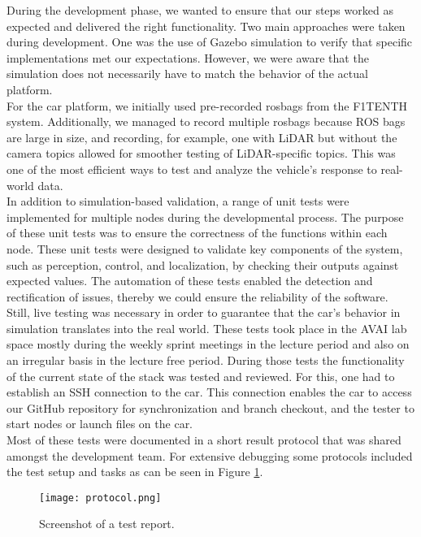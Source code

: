 During the development phase, we wanted to ensure that our steps worked as expected and delivered the right functionality. Two main approaches were taken during development. One was the use of Gazebo simulation to verify that specific implementations met our expectations. However, we were aware that the simulation does not necessarily have to match the behavior of the actual platform.\\
\newline
For the car platform, we initially used pre-recorded rosbags from the F1TENTH system. Additionally, we managed to record multiple rosbags because ROS bags are large in size, and recording, for example, one with LiDAR but without the camera topics allowed for smoother testing of LiDAR-specific topics. This was one of the most efficient ways to test and analyze the vehicle’s response to real-world data.\\
\newline
In addition to simulation-based validation, a range of unit tests were implemented for multiple nodes during the developmental process. The purpose of these unit tests was to ensure the correctness of the functions within each node. These unit tests were designed to validate key components of the system, such as perception, control, and localization, by checking their outputs against expected values. The automation of these tests enabled the detection and rectification of issues, thereby we could ensure the reliability of the software.\\
\newline
Still, live testing was necessary in order to guarantee that the car's behavior in simulation translates into the real world. These tests took place in the AVAI lab space mostly during the weekly sprint meetings in the lecture period and also on an irregular basis in the lecture free period. During those tests the functionality of the current state of the stack was tested and reviewed. For this, one had to establish an SSH connection to the car. This connection enables the car to access our GitHub repository for synchronization and branch checkout, and the tester to start nodes or launch files on the car. \\
\newline
Most of these tests were documented in a short result protocol that was shared amongst the development team. For extensive debugging some protocols included the test setup and tasks as can be seen in Figure \ref{fig:protocol}.

\begin{figure}[htp]
	\vskip 0.2in
	\begin{center}
		\centerline{\texttt{[image: protocol.png]}}
		\caption{Screenshot of a test report.}
		\label{fig:protocol}
	\end{center}
	\vskip -0.2in
\end{figure}
